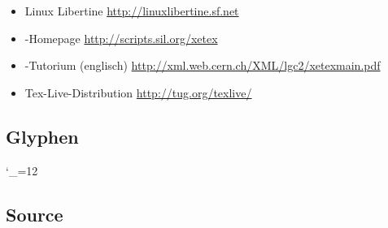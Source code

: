 \documentclass{fontdoku}
\begin{document}
\begin{itemize}
   \item Linux Libertine \hfill\url{http://linuxlibertine.sf.net}
   \item \XeTeX-Homepage \hfill\url{http://scripts.sil.org/xetex}
   \item \XeTeX-Tutorium (englisch) \hfill\url{http://xml.web.cern.ch/XML/lgc2/xetexmain.pdf}
   \item Tex-Live-Distribution \hfill\url{http://tug.org/texlive/}
\end{itemize}

\newpage
\subsection{Glyphen}

\setlength{\columnseprule}{.5pt}
\setlength{\columnsep}{1cm}
\begin{multicols}{3}
   \newcommand{\GYLPHNAME}[1]{\makebox[3cm][l]{#1}\hfill{\Huge\fbox{\libertineGlyph{#1}\strut}}\hfill\mbox{}\newline}
   \catcode`\_=12%
\end{multicols}


\newpage
\subsection{Source}



\newpage
\printindex
\end{document}

